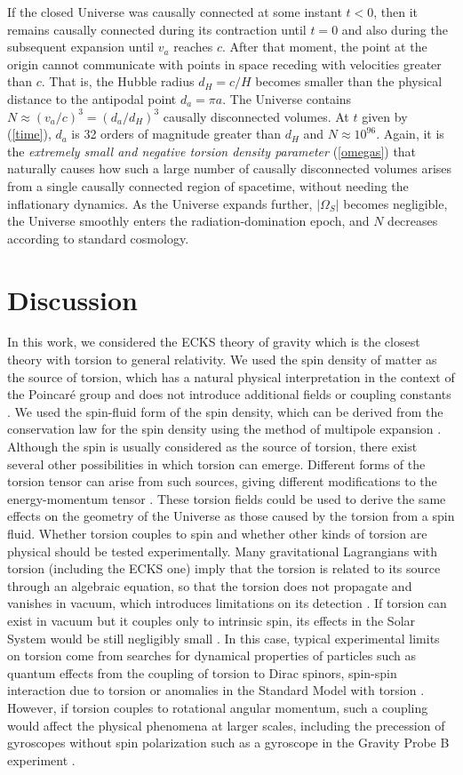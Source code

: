 \documentclass[prd,onecolumn,nofootinbib,showkeys]{revtex4}
\begin{document}
If the closed Universe was causally connected at some instant $t<0$, then it remains causally connected during its contraction until $t=0$ and also during the subsequent expansion until $v_a$ reaches $c$.
After that moment, the point at the origin cannot communicate with points in space receding with velocities greater than $c$.
That is, the Hubble radius $d_H=c/H$ becomes smaller than the physical distance to the antipodal point $d_a=\pi a$.
The Universe contains $N\approx(v_a/c)^3=(d_a/d_H)^3$ causally disconnected volumes.
At $t$ given by (\ref{time}), $d_a$ is 32 orders of magnitude greater than $d_H$ and $N\approx10^{96}$.
Again, it is the {\em extremely small and negative torsion density parameter} (\ref{omegas}) that naturally causes how such a large number of causally disconnected volumes arises from a single causally connected region of spacetime, without needing the inflationary dynamics.
As the Universe expands further, $|\Omega_S|$ becomes negligible, the Universe smoothly enters the radiation-domination epoch, and $N$ decreases according to standard cosmology.

\section{Discussion}
In this work, we considered the ECKS theory of gravity which is the closest theory with torsion to general relativity.
We used the spin density of matter as the source of torsion, which has a natural physical interpretation in the context of the Poincar\'{e} group and does not introduce additional fields or coupling constants \cite{HHKN}.
We used the spin-fluid form of the spin density, which can be derived from the conservation law for the spin density using the method of multipole expansion \cite{Niko0,NSH}.
Although the spin is usually considered as the source of torsion, there exist several other possibilities in which torsion can emerge.
Different forms of the torsion tensor can arise from such sources, giving different modifications to the energy-momentum tensor \cite{Cap}.
These torsion fields could be used to derive the same effects on the geometry of the Universe as those caused by the torsion from a spin fluid.
Whether torsion couples to spin and whether other kinds of torsion are physical should be tested experimentally.
Many gravitational Lagrangians with torsion (including the ECKS one) imply that the torsion is related to its source through an algebraic equation, so that the torsion does not propagate and vanishes in vacuum, which introduces limitations on its detection \cite{Sha,Ham}.
If torsion can exist in vacuum but it couples only to intrinsic spin, its effects in the Solar System would be still negligibly small \cite{HHKN}.
In this case, typical experimental limits on torsion come from searches for dynamical properties of particles such as quantum effects from the coupling of torsion to Dirac spinors, spin-spin interaction due to torsion or anomalies in the Standard Model with torsion \cite{Sha,Ham}.
However, if torsion couples to rotational angular momentum, such a coupling would affect the physical phenomena at larger scales, including the precession of gyroscopes without spin polarization such as a gyroscope in the Gravity Probe B experiment \cite{Mao}.
\end{document}
